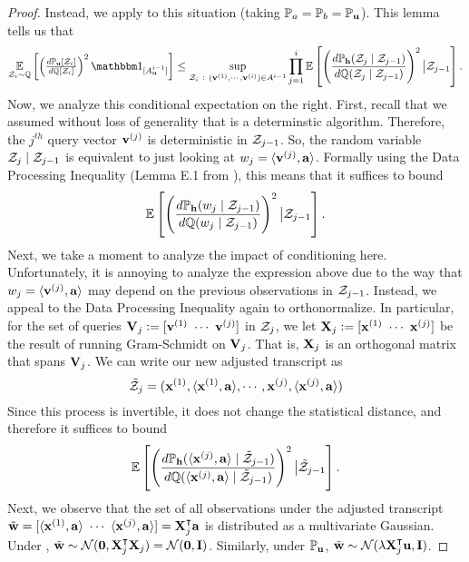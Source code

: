 \begin{proof}
Instead, we apply  to this situation (taking \({\mathbb P}_a = {\mathbb P}_b = {\mathbb P}_{\boldsymbol{\mathrm{u}}}\)).
This lemma tells us that
\[
    \E_{\cZ_i\sim\bbQ}\left[
        \left(\tsfrac{d\bbP_{\vu}[\cZ_i]}{d\bbQ[\cZ_i]}\right)^2
        \mathbbm1_{[A_{\vu}^{i-1}]}
    \right]
    \leq \sup_{\cZ_i ~:~ (\vv^{(1)},\cdots,\vv^{(i)})\in A^{i-1}}
    \prod_{j=1}^i
    \E\left[
            \left(\frac{d\bbP_{\vh}(\cZ_j \mid \cZ_{j-1})}{d\bbQ(\cZ_j \mid \cZ_{j-1})}\right)^2 \big| \cZ_{j-1}
    \right].
\]
Now, we analyze this conditional expectation on the right.
First, recall that we assumed without loss of generality that \cA is a determinstic algorithm.
Therefore, the \(j^{th}\) query vector \(\boldsymbol{\mathrm{v}}^{(j)}\) is deterministic in \({\mathcal Z}_{j-1}\).
So, the random variable \({\mathcal Z}_j \mid {\mathcal Z}_{j-1}\) is equivalent to just looking at \(w_j = \langle \boldsymbol{\mathrm{v}}^{(j)}, \boldsymbol{\mathrm{a}} \rangle\).
Formally using the Data Processing Inequality (Lemma E.1 from \cite{simchowitz2017gap}), this means that it suffices to bound
\[
    \operatorname*{\mathbb{E}}\left[
        \left(\frac{d{\mathbb P}_{\boldsymbol{\mathrm{h}}}( w_j \mid {\mathcal Z}_{j-1})}{d{\mathbb Q}( w_j \mid {\mathcal Z}_{j-1})}\right)^2 \big| {\mathcal Z}_{j-1}
    \right].
\]
Next, we take a moment to analyze the impact of conditioning here.
Unfortunately, it is annoying to analyze the expression above due to the way that \(w_j = \langle \boldsymbol{\mathrm{v}}^{(j)}, \boldsymbol{\mathrm{a}} \rangle\) may depend on the previous observations in \({\mathcal Z}_{j-1}\).
Instead, we appeal to the Data Processing Inequality again to orthonormalize.
In particular, for the set of queries \(\mathbf{V}_j \;{\vcentcolon=}\; [\boldsymbol{\mathrm{v}}^{(1)} ~ \cdots ~ \boldsymbol{\mathrm{v}}^{(j)}]\) in \({\mathcal Z}_j\), we let \(\mathbf{X}_j \;{\vcentcolon=}\; [\boldsymbol{\mathrm{x}}^{(1)} ~ \cdots ~ \boldsymbol{\mathrm{x}}^{(j)}]\) be the result of running Gram-Schmidt on \(\mathbf{V}_j\).
That is, \(\mathbf{X}_j\) is an orthogonal matrix that spans \(\mathbf{V}_j\).
We can write our new adjusted transcript as
\[
    \tilde {{\mathcal Z}}_j = ( \boldsymbol{\mathrm{x}}^{(1)}, \langle \boldsymbol{\mathrm{x}}^{(1)}, \boldsymbol{\mathrm{a}}\rangle, \cdots, \boldsymbol{\mathrm{x}}^{(j)}, \langle \boldsymbol{\mathrm{x}}^{(j)}, \boldsymbol{\mathrm{a}}\rangle)
\]
Since this process is invertible, it does not change the statistical distance, and therefore it suffices to bound
\[
    \operatorname*{\mathbb{E}}\left[
        \left(\frac{d{\mathbb P}_{\boldsymbol{\mathrm{h}}}( \langle \boldsymbol{\mathrm{x}}^{(j)}, \boldsymbol{\mathrm{a}}\rangle \mid \tilde{{\mathcal Z}}_{j-1})}{d{\mathbb Q}( \langle \boldsymbol{\mathrm{x}}^{(j)}, \boldsymbol{\mathrm{a}}\rangle \mid \tilde{{\mathcal Z}}_{j-1})}\right)^2 \big| \tilde{{\mathcal Z}}_{j-1}
    \right].
\]
Next, we observe that the set of all observations under the adjusted transcript \(\tilde{\boldsymbol{\mathrm{w}}} = [\langle \boldsymbol{\mathrm{x}}^{(1)}, \boldsymbol{\mathrm{a}}\rangle ~ \cdots ~ \langle \boldsymbol{\mathrm{x}}^{(j)}, \boldsymbol{\mathrm{a}}\rangle] = \mathbf{X}_j^\intercal\boldsymbol{\mathrm{a}}\) is distributed as a multivariate Gaussian.
Under \bbQ, \(\tilde{\boldsymbol{\mathrm{w}}} \sim {\mathcal N}(\boldsymbol{\mathrm{0}}, \mathbf{X}_j^\intercal\mathbf{X}_j) = {\mathcal N}(\boldsymbol{\mathrm{0}},\mathbf{I})\).
Similarly, under \({\mathbb P}_{\boldsymbol{\mathrm{u}}}\), \(\tilde{\boldsymbol{\mathrm{w}}} \sim {\mathcal N}(\lambda\mathbf{X}_j^\intercal\boldsymbol{\mathrm{u}}, \mathbf{I})\).

\end{proof}
